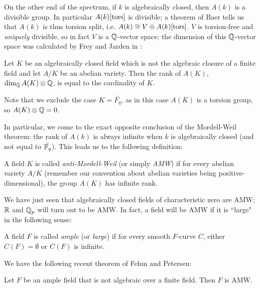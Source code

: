 On the other end of the spectrum, if $k$ is algebraically closed, then $A(k)$ is a divisible group. In particular $A(k)[\operatorname{tors}]$ is divisible; a theorem of Baer \cite{baer} tells us that $A(k)$ is thus torsion split, i.e. $A(k)\cong V\oplus A(k)[\operatorname{tors}]$. $V$ is torsion-free and \emph{uniquely} divisible, so in fact $V$ is a $\mathbb{Q}$-vector space; the dimension of this $\mathbb{Q}$-vector space was calculated by Frey and Jarden in \cite{frey-jarden}:

\begin{theorem}
\label{frey-jarden}
Let $K$ be an algebraically closed field which is not the algebraic closure of a finite field and let $A/K$ be an abelian variety. Then the rank of $A(K)$, $\operatorname{dim}_{\mathbb{Q}} A(K)\otimes \mathbb{Q}$, is equal to the cardinality of $K$.
\end{theorem}

Note that we exclude the case $K=\bar{F_q}$, as in this case $A(K)$ is a torsion group, so $A(K)\otimes \mathbb{Q}=0$.

In particular, we come to the exact opposite conclusion of the Mordell-Weil theorem: the rank of $A(k)$ is always infinite when $k$ is algebraically closed (and not equal to $\bar{\mathbb{F}_q}$). This leads us to the following definition:

\begin{definition}
A field $K$ is called \emph{anti-Mordell-Weil} (or simply \emph{AMW}) if for every abelian variety $A/K$ (remember our convention about abelian varieties being positive-dimensional), the group $A(K)$ has infinite rank.
\end{definition}

We have just seen that algebraically closed fields of characteristic zero are AMW; $\mathbb{R}$ and $\mathbb{Q}_p$ will turn out to be AMW. In fact, a field will be AMW if it is ``large" in the following sense:

\begin{definition}
\label{ample}
A field $F$ is called \emph{ample} (or \emph{large}) if for every smooth $F$-curve $C$, either $C(F)=\emptyset$ or $C(F)$ is infinite.
\end{definition}

We have the following recent theorem of Fehm and Petersen:

\begin{theorem}
\label{fehm-petersen}
Let $F$ be an ample field that is not algebraic over a finite field. Then $F$ is AMW.
\end{theorem}

